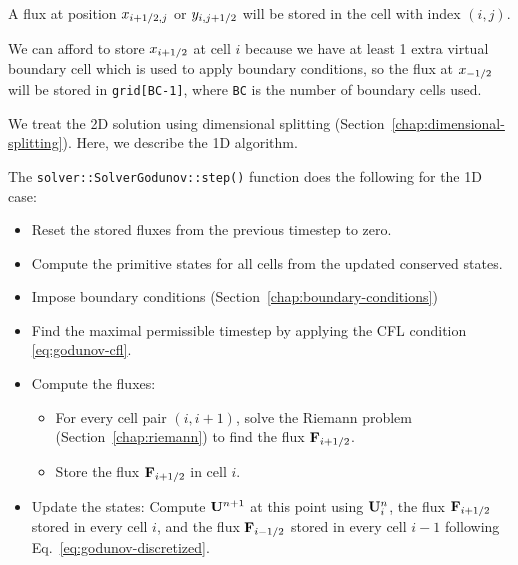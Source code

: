 A flux at position $x_{i+1/2, j}$ or $y_{i, j+1/2}$ will be stored in the
cell with index $(i, j)$.


We can afford to store $x_{i+1/2}$ at cell $i$ because we have at least 1
extra virtual boundary cell which is used to apply boundary conditions, so the
flux at $x_{-1/2}$ will be stored in \verb|grid[BC-1]|, where \texttt{BC} is
the number of boundary cells used.
 

We treat the 2D solution using dimensional splitting
(Section~\ref{chap:dimensional-splitting}). Here, we describe the 1D algorithm.

The \verb|solver::SolverGodunov::step()| function does the following for
the 1D case:

\begin{itemize}

\item Reset the stored fluxes from the previous timestep to zero.

\item Compute the primitive states for all cells from the updated conserved
states.

\item Impose boundary conditions (Section~\ref{chap:boundary-conditions})

\item Find the maximal permissible timestep by applying the CFL condition
\ref{eq:godunov-cfl}.

\item Compute the fluxes:

\begin{itemize}

\item For every cell pair $(i, i+1)$, solve the Riemann problem
	(Section~\ref{chap:riemann}) to find the flux $\mathbf{F}_{i+1/2}$.
\item Store the flux $\mathbf{F}_{i+1/2}$ in cell $i$.
\end{itemize}
\item Update the states: Compute $\mathbf{U}^{n+1}$ at this point using
$\mathbf{U}_i^n$, the flux $\mathbf{F}_{i+1/2}$ stored in every cell $i$, and the flux
$\mathbf{F}_{i-1/2}$ stored in every cell $i-1$ following
Eq.~\ref{eq:godunov-discretized}.
\end{itemize}




